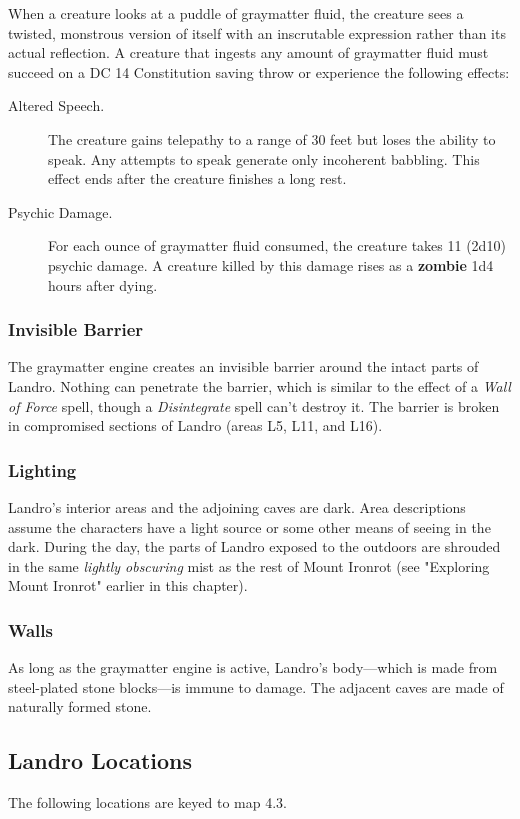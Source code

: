 \documentclass[10pt,a4paper,twoside,bg=print,twocolumn,openany,nodeprecatedcode]{dndbook}
\begin{document}
When a creature looks at a puddle of graymatter fluid, the creature sees a twisted, monstrous version of itself with an inscrutable expression rather than its actual reflection. A creature that ingests any amount of graymatter fluid must succeed on a DC 14 Constitution saving throw or experience the following effects:


\begin{description}
\item[Altered Speech.]
The creature gains telepathy to a range of 30 feet but loses the ability to speak. Any attempts to speak generate only incoherent babbling. This effect ends after the creature finishes a long rest.
\item[Psychic Damage.]
For each ounce of graymatter fluid consumed, the creature takes 11 (2d10) psychic damage. A creature killed by this damage rises as a \textbf{zombie} 1d4 hours after dying.
\end{description}

\subsubsection{Invisible Barrier}
The graymatter engine creates an invisible barrier around the intact parts of Landro. Nothing can penetrate the barrier, which is similar to the effect of a \textit{Wall of Force} spell, though a \textit{Disintegrate} spell can't destroy it. The barrier is broken in compromised sections of Landro (areas L5, L11, and L16).

\subsubsection{Lighting}
Landro's interior areas and the adjoining caves are dark. Area descriptions assume the characters have a light source or some other means of seeing in the dark. During the day, the parts of Landro exposed to the outdoors are shrouded in the same \textit{lightly obscuring} mist as the rest of Mount Ironrot (see "Exploring Mount Ironrot" earlier in this chapter).

\subsubsection{Walls}
As long as the graymatter engine is active, Landro's body—which is made from steel-plated stone blocks—is immune to damage. The adjacent caves are made of naturally formed stone.

\subsection{Landro Locations}
The following locations are keyed to map 4.3.
\end{document}
